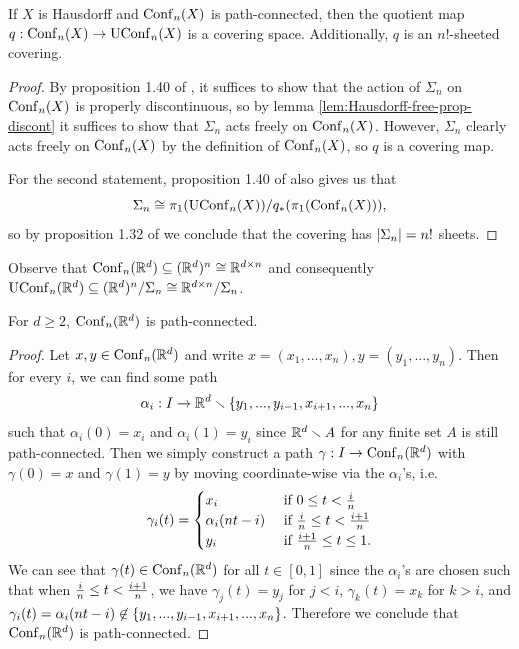 \begin{lemma}\label{lem:permutation-quotient-covering}
    If $X$ is Hausdorff and $\operatorname{Conf}_n(X)$ is path-connected, then the quotient map $q : \operatorname{Conf}_n(X) \to \operatorname{UConf}_n(X)$ is a covering space.
    Additionally, $q$ is an $n!$-sheeted covering.
    \begin{proof}
        By proposition 1.40 of \cite{hatcher2005algebraic}, it suffices to show that the action of $\Sigma_n$ on $\operatorname{Conf}_n(X)$ is properly discontinuous, so by lemma \ref{lem:Hausdorff-free-prop-discont} it suffices to show that $\Sigma_n$ acts freely on $\operatorname{Conf}_n(X)$.
        However, $\Sigma_n$ clearly acts freely on $\operatorname{Conf}_n(X)$ by the definition of $\operatorname{Conf}_n(X)$, so $q$ is a covering map.

        For the second statement, proposition 1.40 of \cite{hatcher2005algebraic} also gives us that
        \[
            \Sigma_n \cong \pi_1(\operatorname{UConf}_n(X))/q_*(\pi_1(\operatorname{Conf}_n(X))),
        \]
        so by proposition 1.32 of \cite{hatcher2005algebraic} we conclude that the covering has $\left| \Sigma_n \right| = n!$ sheets.
    \end{proof}
\end{lemma}

\begin{remark}
    Observe that $\operatorname{Conf}_n(\mathbb{R}^d) \subseteq (\mathbb{R}^d)^n \cong \mathbb{R}^{d \times n}$ and consequently $\operatorname{UConf}_n(\mathbb{R}^d) \subseteq (\mathbb{R}^d)^n / \Sigma_n \cong \mathbb{R}^{d \times n} / \Sigma_n$.
\end{remark}

\begin{lemma}\label{lem:conf-Rd-pconn}
    For $d \geq 2$, $\operatorname{Conf}_n(\mathbb{R}^d)$ is path-connected.
    \begin{proof}
        Let $x,y \in \operatorname{Conf}_n(\mathbb{R}^d)$ and write $x = (x_1,...,x_n), y = (y_1,...,y_n)$.
        Then for every $i$, we can find some path
        \[
            \alpha_i : I \to \mathbb{R}^{d} \smallsetminus \left\{ y_1,...,y_{i-1}, x_{i+1},...,x_n \right\}
        \]
        such that $\alpha_i(0) = x_i$ and $\alpha_i(1) = y_i$ since $\mathbb{R}^d \smallsetminus A$ for any finite set $A$ is still path-connected.
        Then we simply construct a path $\gamma : I \to \operatorname{Conf}_n(\mathbb{R}^d)$ with $\gamma(0) = x$ and $\gamma(1) = y$ by moving coordinate-wise via the $\alpha_i$'s, i.e.
        \[
            \gamma_i(t)
            = \begin{cases}
                x_i &\text{ if } 0 \leq t < \frac{i}{n} \\
                \alpha_i(nt - i) &\text{ if } \frac{i}{n} \leq t < \frac{i+1}{n} \\
                y_i & \text{ if } \frac{i+1}{n} \leq t \leq 1.
            \end{cases}
        \]
        We can see that $\gamma(t) \in \operatorname{Conf}_n(\mathbb{R}^d)$ for all $t \in [0,1]$ since the $\alpha_i$'s are chosen such that when $\frac{i}{n} \leq t < \frac{i+1}{n}$, we have $\gamma_j(t) = y_j$ for $j < i$, $\gamma_k(t) = x_k$ for $k > i$, and $\gamma_i(t) = \alpha_i(nt-i) \not\in \left\{ y_1,...,y_{i-1},x_{i+1},...,x_n \right\}$.
        Therefore we conclude that $\operatorname{Conf}_n(\mathbb{R}^d)$ is path-connected.
    \end{proof}
\end{lemma}

